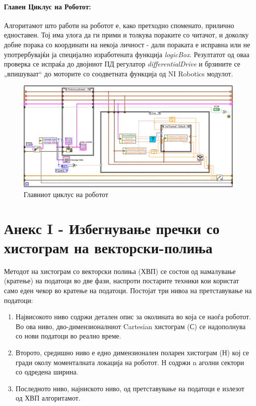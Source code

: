 \documentclass[11pt]{article}
\begin{document}
    \paragraph{Главен Циклус на Роботот:\\}
      Алгоритамот што работи на роботот е, како претходно споменато, прилично едноставен. Тој има улога да ги прими и толкува пораките со читачот, и доколку добие порака со координати на некоја личност - дали пораката е исправна или не употрербувајќи ја специјално изработената функција \textit{logicBox}. Резултатот од оваа проверка се испраќа до двојниот ПД регулатор \textit{differentialDrive} и брзините се „впишуваат“ до моторите со соодветната функција од NI Robotics модулот.

      \begin{figure}
        \centering
        \includegraphics[angle = -90, scale = 0.8]{./images/robot_main_loop.png}
        \caption{Главниот циклус на роботот}
        \label{fig:robot_main}
      \end{figure}

\newpage

\section{Анекс I - Избегнување пречки со хистограм на векторски-полиња} %
  \label{sec:app1-avoidance}
  Методот на хистограм со векторски полиња (ХВП) се состои од намалување (кратење) на податоци во две фази, наспроти постарите техники кои користат само еден чекор во кратење на податоци. Постојат три нивоа на претставување на податоци:

  \begin{enumerate}
    \item Највисокото ниво содржи детален опис за околината во која се наоѓа роботот. Во ова ниво, дво-димензионалниот Cartesian хистограм (С) се надополнува со нови податоци во реално време.
    \item Второто, средишно ниво е едно димензионален поларен хистограм (Н) кој се гради околу моменталната локација на роботот. Н содржи n аголни сектори со одредена ширина.
    \item Последното ниво, најниското ниво, од претставување на податоци е излезот од ХВП алгоритамот.
    \end{enumerate}
\end{document}
